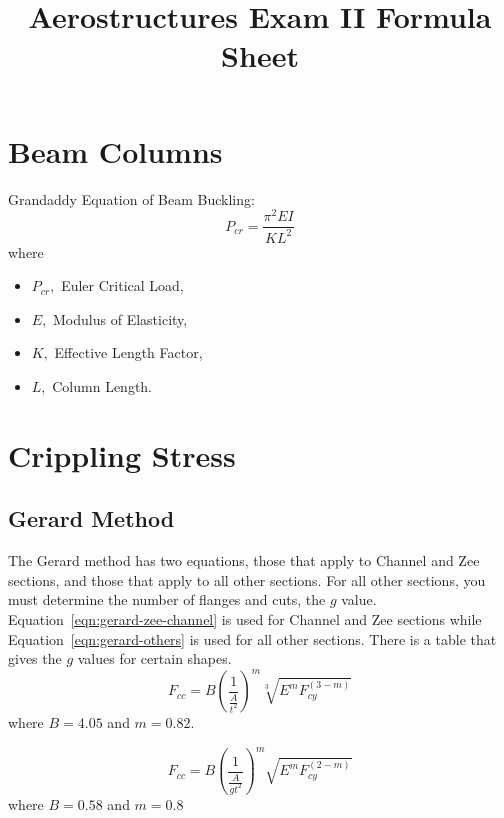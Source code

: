 \documentclass{article}
\title{Aerostructures Exam II Formula Sheet}
\author{}
\date{}
\begin{document}
\maketitle
\section{Beam Columns}
Grandaddy Equation of Beam Buckling:
\begin{equation}\label{eqn:grandaddy}
P_{cr} = \frac{\pi ^ 2 EI}{KL^2}
\end{equation}
where
\begin{itemize}
    \item $P_{cr},$ Euler Critical Load,
    \item $E,$ Modulus of Elasticity,
    \item $K,$ Effective Length Factor,
    \item $L,$ Column Length.
\end{itemize}
\section{Crippling Stress}
\subsection{Gerard Method}
The Gerard method has two equations, those that apply to Channel and Zee sections, and those that apply to all other sections.
For all other sections, you must determine the number of flanges and cuts, the $g$ value.
Equation~\ref{eqn:gerard-zee-channel} is used for Channel and Zee sections while Equation~\ref{eqn:gerard-others} is used for all other sections.
There is a table that gives the $g$ values for certain shapes.
\begin{equation}\label{eqn:gerard-zee-channel}
    F_{cc} = B\left(\frac{1}{\frac{A}{t^2}}\right)^m\sqrt[3]{E^mF_{cy}^{(3-m)}}
\end{equation}
where $B = 4.05$ and $m=0.82$.

\begin{equation}\label{eqn:gerard-others}
   F_{cc} = B\left(\frac{1}{\frac{A}{gt^2}}\right)^m\sqrt{E^mF_{cy}^{(2-m)}}
\end{equation}
where $B = 0.58$ and $ m = 0.8$
\end{document}
